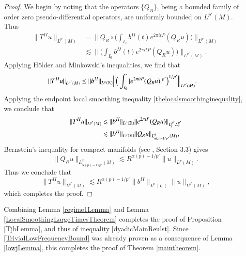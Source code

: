 \begin{proof}
    We begin by noting that the operators $\{ Q_R \}$, being a bounded family of order zero pseudo-differential operators, are uniformly bounded on $L^{p'}(M)$. Thus
    \begin{equation}
    \begin{split}
        \| T^{II} u \|_{L^{p'}(M)} &= \Big\| Q_R \circ \Big( \int_{I_0} b^{II}(t) e^{2 \pi i tP} (Q_R u) \Big) \Big\|_{L^{p'}(M)}\\
        &\lesssim \Big\| \Big( \int_{I_0} b^{II}(t) e^{2 \pi i tP} (Q_R u) \Big) \Big\|_{L^{p'}(M)}.
    \end{split}
    \end{equation}
    Applying H\"{o}lder and Minkowski's inequalities, we find that
    \begin{equation}
    \begin{split}
        \| T^{II}u \|_{L^{p'}(M)} &\leq \| b^{II} \|_{L^p(\operatorname{\mathbb{R}})} \Big\| \Big( \int_{I_0} |e^{2 \pi i t P} (Q_R u)|^{p'} \Big)^{1/p'} \Big\|_{L^{p'}(M)}.
    \end{split}
    \end{equation}
    Applying the endpoint local smoothing inequality \eqref{thelocalsmoothinginequality}, we conclude that
    \begin{equation}
    \begin{split}
        \| T^{II} u \|_{L^{p'}(M)} &\lesssim \| b^{II} \|_{L^p(\operatorname{\mathbb{R}})}  \| e^{2 \pi i P} (Q_R u) \|_{L^{p'}_t L^{p'}_x}\\
        &\lesssim  \| b^{II} \|_{L^p(\operatorname{\mathbb{R}})}  \| Q_R u \|_{L^q_{\alpha(p) - 1/p'}(M)},
    \end{split}
    \end{equation}
    Bernstein's inequality for compact manifolds (see \cite{Sogge}, Section 3.3) gives
    \begin{equation}
        \| Q_R u \|_{L^{q}_{\alpha(p) - 1/p'}(M)} \lesssim R^{\alpha(p) - 1/p'} \| u \|_{L^p(M)}.
    \end{equation}
    Thus we conclude that
    \begin{equation}
        \| T^{II}u \|_{L^{p'}(M)} \lesssim R^{\alpha(p) - 1/p'} \| b^{II} \|_{L^p(I_0)} \| u \|_{L^{p'}(M)},
    \end{equation}
    which completes the proof.
\end{proof}

Combining Lemma \ref{regime1Lemma} and Lemma \ref{LocalSmoothingLargeTimesTheorem} completes the proof of Proposition \ref{TjbLemma}, and thus of inequality \eqref{dyadicMainReulst}. Since \eqref{TrivialLowFrequencyBound} was already proven as a consequence of Lemma \ref{lowjLemma}, this completes the proof of Theorem \ref{maintheorem}.

